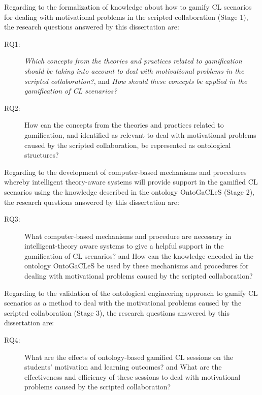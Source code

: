 Regarding to the formalization of knowledge about how to gamify CL scenarios for dealing with motivational problems in the scripted collaboration (Stage 1), the research questions answered by this dissertation are:

\begin{description}
\item[RQ1:]
\emph{Which concepts from the theories and practices related to gamification should be taking into account to deal with motivational problems in the scripted collaboration?}, and
\emph{How should these concepts be applied in the gamification of CL scenarios?}

\item[RQ2:]
How can the concepts from the theories and practices related to gamification, and identified as relevant to deal with motivational problems caused by the scripted collaboration, be represented as ontological structures?

\end{description}

Regarding to the development of computer-based mechanisms and procedures whereby intelligent theory-aware systems will provide support in the gamified CL scenarios using the knowledge described in the ontology OntoGaCLeS (Stage 2), the research questions answered by this dissertation are:

\begin{description}
\item[RQ3:]
What computer-based mechanisms and procedure are necessary in intelligent-theory aware systems to give a helpful support in the gamification of CL scenarios? and How can the knowledge encoded in the ontology OntoGaCLeS be used by these mechanisms and procedures for dealing with motivational problems caused by the scripted collaboration?
\end{description}

Regarding to the validation of the ontological engineering approach to gamify CL scenarios as a method to deal with the motivational problems caused by the scripted collaboration (Stage 3), the research questions answered by this dissertation are:

\begin{description}
\item[RQ4:]
What are the effects of ontology-based gamified CL sessions on the students’ motivation and learning outcomes? and What are the effectiveness and efficiency of these sessions to deal with motivational problems caused by the scripted collaboration?
\end{description}

